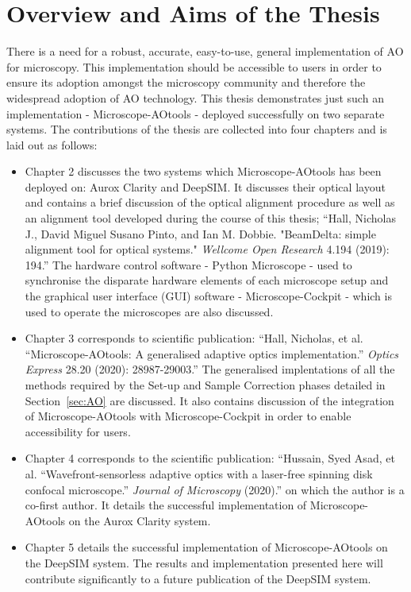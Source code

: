 \section{Overview and Aims of the Thesis}
\label{sec:overview}

There is a need for a robust, accurate, easy-to-use, general implementation 
of AO for microscopy\cite{ji2017adaptive,rodriguez2018adaptive}.
This implementation should be accessible to users in order to ensure its
adoption amongst the microscopy community and therefore the widespread 
adoption of AO technology. This thesis demonstrates just such an 
implementation - Microscope-AOtools - deployed successfully on two separate 
systems. The contributions of the thesis are collected into four chapters 
and is laid out as follows:

\begin{itemize}
	\item Chapter 2 discusses the two systems which Microscope-AOtools has
	been deployed on: Aurox Clarity and DeepSIM. It discusses their optical 
	layout and contains a brief discussion of the optical alignment 
	procedure as well as an alignment tool developed during the course of 
	this thesis; ``Hall, Nicholas J., David Miguel Susano Pinto, and Ian M. 
	Dobbie. "BeamDelta: simple alignment tool for optical systems." 
	\textit{Wellcome Open Research} 4.194 (2019): 194.''\cite{dobbie2019beamdelta} 
	The hardware control software - Python Microscope - used to synchronise 
	the disparate hardware elements of each microscope setup and the 
	graphical user interface (GUI) software - Microscope-Cockpit - which 
	is used to operate the microscopes are also discussed.
	\item Chapter 3 corresponds to scientific publication: ``Hall, Nicholas, 
	et al. ``Microscope-AOtools: A generalised adaptive optics 
	implementation.''
	\textit{Optics Express} 28.20 (2020): 28987-29003.''\cite{hall2020microscope}
	The generalised implentations of all the methods required by the Set-up and 
	Sample Correction phases detailed in Section~\ref{sec:AO} are discussed.
	It also contains discussion of the integration of Microscope-AOtools with
	Microscope-Cockpit in order to enable accessibility for users.
	\item Chapter 4 corresponds to the scientific publication: ``Hussain, 
	Syed Asad, et al. ``Wavefront-sensorless adaptive optics with a 
	laser-free spinning disk confocal microscope.'' \textit{Journal of 
		Microscopy} (2020).'' 
	on which the author is a co-first author\cite{hussain2020wavefront}. It details the successful 
	implementation of Microscope-AOtools on the Aurox Clarity system.
	\item Chapter 5 details the successful implementation of Microscope-AOtools 
	on the DeepSIM system. The results and implementation presented here will
	contribute significantly to a future publication of the DeepSIM system.
\end{itemize}

